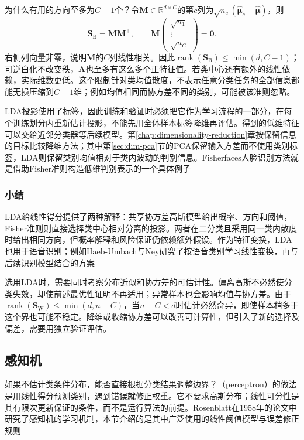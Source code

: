 为什么有用的方向至多为$C-1$个？令$\bm{M}\in\mathbb{R}^{d\times C}$的第$c$列为$\sqrt{n_c}(\hat{\bm{\mu}}_c-\hat{\bm{\mu}})$，则
\[
  \bm{S}_{\mathrm{B}}=\bm{M}\bm{M}^{\top},\qquad
  \bm{M}
  \begin{pmatrix}\sqrt{n_1}\\ \vdots\\ \sqrt{n_C}\end{pmatrix}
  =\bm{0}.
\]
右侧列向量非零，说明$\bm{M}$的$C$列线性相关。因此$\operatorname{rank}(\bm{S}_{\mathrm{B}})\leq\min(d,C-1)$；可逆白化不改变秩，$\bm{A}$也至多有这么多个正特征值。若类中心还有额外的线性依赖，实际维数更低。这个限制针对类均值散度，不表示任意分类任务的全部信息都能无损压缩到$C-1$维；例如均值相同而协方差不同的类别，可能被该准则忽略。

LDA投影使用了标签，因此训练和验证时必须把它作为学习流程的一部分，在每个训练划分内重新估计投影，不能先用全体样本标签降维再评估。得到的低维特征可以交给近邻分类器等后续模型。第\ref{chap:dimensionality-reduction}章按保留信息的目标比较降维方法；其中第\ref{sec:dim-pca}节的PCA保留输入方差而不使用类别标签，LDA则保留类别均值相对于类内波动的判别信息。Fisherfaces人脸识别方法就是借助Fisher准则构造低维判别表示的一个具体例子

\subsubsection{小结}
\label{sec:classification-lda-summary}

LDA给线性得分提供了两种解释：共享协方差高斯模型给出概率、方向和阈值，Fisher准则则直接选择类中心相对分离的投影。两者在二分类且采用同一类内散度时给出相同方向，但概率解释和风险保证仍依赖额外假设。作为特征变换，LDA也用于语音识别；例如Haeb-Umbach与Ney研究了按语音类别学习线性变换，再与后续识别模型结合的方案

选用LDA时，需要同时考察分布近似和协方差的可估计性。偏离高斯不必然使分类失效，却使前述最优性证明不再适用；异常样本也会影响均值与协方差。由于$\operatorname{rank}(\bm{S}_{\mathrm{W}})\leq\min(d,n-C)$，当$n-C<d$时估计必然奇异，即使样本稍多于这个界也可能不稳定。降维或收缩协方差可以改善可计算性，但引入了新的选择及偏差，需要用独立验证评估。

\subsection{感知机}
\label{sec:classification-perceptron}

如果不估计类条件分布，能否直接根据分类结果调整边界？（perceptron）的做法是用线性得分预测类别，遇到错误就修正权重。它不要求高斯分布；线性可分性是其有限次更新保证的条件，而不是运行算法的前提。Rosenblatt在1958年的论文中研究了感知机的学习机制，本节介绍的是其中广泛使用的线性阈值模型与误差修正规则

